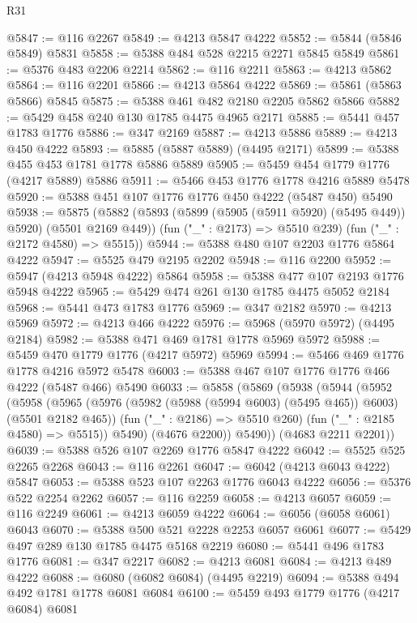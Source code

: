 \begin{lexlean}{R31}
\begin{coremodule}
@5847 := @116 @2267
@5849 := @4213 @5847 @4222
@5852 := @5844 (@5846 @5849) @5831
@5858 := @5388 @484 @528 @2215 @2271 @5845 @5849
@5861 := @5376 @483 @2206 @2214
@5862 := @116 @2211
@5863 := @4213 @5862
@5864 := @116 @2201
@5866 := @4213 @5864 @4222
@5869 := @5861 (@5863 @5866) @5845
@5875 := @5388 @461 @482 @2180 @2205 @5862 @5866
@5882 := @5429 @458 @240 @130 @1785 @4475 @4965 @2171
@5885 := @5441 @457 @1783 @1776
@5886 := @347 @2169
@5887 := @4213 @5886
@5889 := @4213 @450 @4222
@5893 := @5885 (@5887 @5889) (@4495 @2171)
@5899 := @5388 @455 @453 @1781 @1778 @5886 @5889
@5905 := @5459 @454 @1779 @1776 (@4217 @5889) @5886
@5911 := @5466 @453 @1776 @1778 @4216 @5889 @5478
@5920 := @5388 @451 @107 @1776 @1776 @450 @4222 (@5487 @450) @5490
@5938 := @5875
    (@5882
      (@5893 (@5899 (@5905 (@5911 @5920) (@5495 @449)) @5920) (@5501 @2169 @449))
      (fun ("_" : @2173) => @5510 @239)
      (fun ("_" : @2172 @4580) => @5515))
@5944 := @5388 @480 @107 @2203 @1776 @5864 @4222
@5947 := @5525 @479 @2195 @2202
@5948 := @116 @2200
@5952 := @5947 (@4213 @5948 @4222) @5864
@5958 := @5388 @477 @107 @2193 @1776 @5948 @4222
@5965 := @5429 @474 @261 @130 @1785 @4475 @5052 @2184
@5968 := @5441 @473 @1783 @1776
@5969 := @347 @2182
@5970 := @4213 @5969
@5972 := @4213 @466 @4222
@5976 := @5968 (@5970 @5972) (@4495 @2184)
@5982 := @5388 @471 @469 @1781 @1778 @5969 @5972
@5988 := @5459 @470 @1779 @1776 (@4217 @5972) @5969
@5994 := @5466 @469 @1776 @1778 @4216 @5972 @5478
@6003 := @5388 @467 @107 @1776 @1776 @466 @4222 (@5487 @466) @5490
@6033 := @5858
    (@5869
      (@5938
        (@5944
          (@5952
            (@5958
              (@5965
                (@5976 (@5982 (@5988 (@5994 @6003) (@5495 @465)) @6003) (@5501 @2182 @465))
                (fun ("_" : @2186) => @5510 @260)
                (fun ("_" : @2185 @4580) => @5515))
              @5490)
            (@4676 @2200))
          @5490))
      (@4683 @2211 @2201))
@6039 := @5388 @526 @107 @2269 @1776 @5847 @4222
@6042 := @5525 @525 @2265 @2268
@6043 := @116 @2261
@6047 := @6042 (@4213 @6043 @4222) @5847
@6053 := @5388 @523 @107 @2263 @1776 @6043 @4222
@6056 := @5376 @522 @2254 @2262
@6057 := @116 @2259
@6058 := @4213 @6057
@6059 := @116 @2249
@6061 := @4213 @6059 @4222
@6064 := @6056 (@6058 @6061) @6043
@6070 := @5388 @500 @521 @2228 @2253 @6057 @6061
@6077 := @5429 @497 @289 @130 @1785 @4475 @5168 @2219
@6080 := @5441 @496 @1783 @1776
@6081 := @347 @2217
@6082 := @4213 @6081
@6084 := @4213 @489 @4222
@6088 := @6080 (@6082 @6084) (@4495 @2219)
@6094 := @5388 @494 @492 @1781 @1778 @6081 @6084
@6100 := @5459 @493 @1779 @1776 (@4217 @6084) @6081

\end{coremodule}
\end{lexlean}
